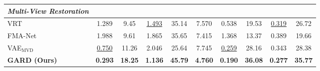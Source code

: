 \begin{table}[t]
{\begin{tabular}{lccccccccc}
\midrule

\textit{Multi-View Restoration} \\
\midrule

VRT~\cite{liang2024vrt}
& 1.289  & 9.45
& \underline{1.493} & 35.14
& 7.570
& 0.538 &  19.53
& \underline{0.319} &  26.72
\\


FMA-Net~\cite{Youk_2024_CVPR}
&  1.988 &   9.61
&  1.865 &   35.65
&  7.415
&  1.368 &   13.37
&  0.389 &   19.66
\\





VAE$_\text{MVD}$
& \underline{0.750} & 11.26
& 2.046 & 25.64   
& 7.745
& \underline{0.259} & 28.16
& 0.343 & 28.38 \\


\textbf{GARD (Ours)}
& \textbf{0.293} & \textbf{18.25}
& \textbf{1.136} & \textbf{45.79} 
& \textbf{4.760}
& \textbf{0.190} & \textbf{36.08}
& \textbf{0.277} & \textbf{35.77} \\


\bottomrule
\end{tabular}
}
\end{table}